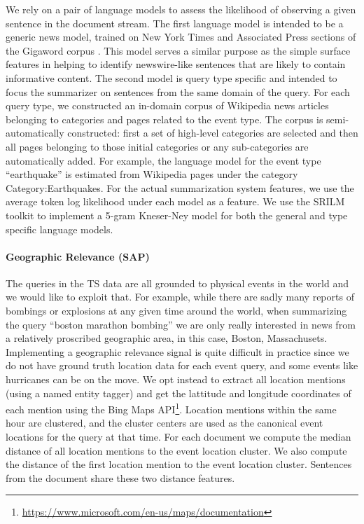 We rely on a pair of language models to assess the likelihood of observing
a given sentence in the document stream. The first language model is 
intended to be a generic news model, trained on New York Times and 
Associated Press sections of the Gigaword corpus \citep{graff2003english}. 
This model serves a similar purpose as the simple surface features in helping
to identify newswire-like sentences that are likely to contain informative
content.
The second model is query type specific and intended to focus the summarizer
on sentences from the same domain of the query. For each query type, we 
constructed an in-domain corpus of Wikipedia news articles belonging to
categories and pages related to the event type. The corpus is 
semi-automatically constructed: first a set of high-level categories are 
selected and then all pages belonging to those initial categories or
any sub-categories are automatically added. 
For example, the language
model for the event type ``earthquake'' is estimated
from Wikipedia pages under the category Category:Earthquakes.
For the actual summarization system features, we use the average token log
likelihood under each model as a feature.
We use the SRILM toolkit \citep{stolke2002srilm} to implement a 5-gram 
Kneser-Ney model \citep{kneser1995improved} for both the general and type
specific language models. 

\paragraph{Geographic Relevance (SAP)} 
The queries in the TS data are all grounded to physical
events in the world and we would like to exploit that. For example, while
there are sadly many reports of bombings or explosions at any given time 
around the world, when summarizing the query ``boston marathon bombing'' 
we are only really interested in news from a relatively proscribed 
geographic area, in this case, Boston, Massachusets. Implementing 
a geographic relevance signal is quite difficult in practice since 
we do not have ground truth location data for each event query, and some
events like hurricanes can be on the move. We opt instead to extract all
location mentions (using a named entity tagger) and get the lattitude
and longitude coordinates
of each mention using the Bing Maps 
API\footnote{\url{https://www.microsoft.com/en-us/maps/documentation}}.
Location
mentions within the same hour are clustered, and the cluster centers are 
used as the canonical event locations for the query at that time. 
For each document we compute the median distance of all location mentions
to the event location cluster. We also compute the distance of the first
location mention to the event location cluster. Sentences from the document
share these two distance features.



